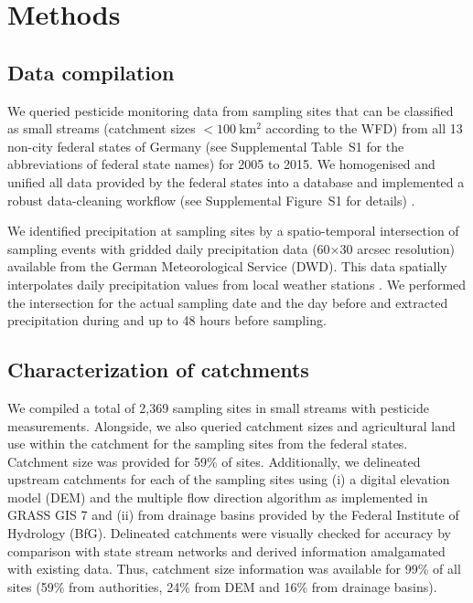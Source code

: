\section{Methods}
\subsection{Data compilation}
We queried pesticide monitoring data from sampling sites that can be classified as small streams (catchment sizes $\mathrm{< 100~km^2}$ according to the WFD) from all 13 non-city federal states of Germany (see Supplemental Table~S1 for the abbreviations of federal state names) for 2005 to 2015.
We homogenised and unified all data provided by the federal states into a database and implemented a robust data-cleaning workflow (see Supplemental Figure~S1 for details) \citep{poisot_best_2015}.

We identified precipitation at sampling sites by a spatio-temporal intersection of sampling events with gridded daily precipitation data (60$\times$30 arcsec resolution) available from the German Meteorological Service (DWD).
This data spatially interpolates daily precipitation values from local weather stations \citep{rauthe_central_2013}. 
We performed the intersection for the actual sampling date and the day before and extracted precipitation during and up to 48 hours before sampling. 


\subsection{Characterization of catchments}
We compiled a total of 2,369 sampling sites in small streams with pesticide measurements. %
Alongside, we also queried catchment sizes and agricultural land use within the catchment for the sampling sites from the federal states. %
Catchment size was provided for 59\% of sites. 
Additionally, we delineated upstream catchments for each of the sampling sites using (i) a digital elevation model (DEM) \citep{eea_digital_2013} and the multiple flow direction algorithm \citep{holmgren_multiple_1994} as implemented in GRASS GIS 7 \citep{neteler_grass_2012} and (ii) from drainage basins provided by the Federal Institute of Hydrology (BfG). 
Delineated catchments were visually checked for accuracy by comparison with state stream networks and derived information amalgamated with existing data.
Thus, catchment size information was available for 99\% of all sites (59\% from authorities, 24\% from DEM and 16\% from drainage basins). 

